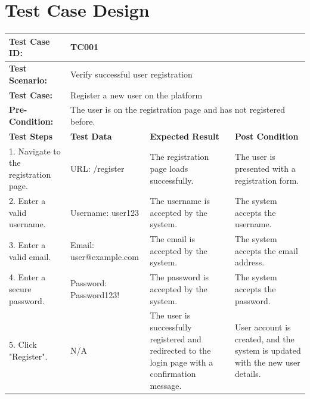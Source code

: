 \documentclass{scrreprt}
\begin{document}
\chapter{Test Case Design}

\begin{longtable}{| m{2cm} | m{5cm} | m{4cm} | m{3cm} |}
\hline
\textbf{Test Case ID:} & \multicolumn{3}{l|}{TC001} \\ \hline
\textbf{Test Scenario:} & \multicolumn{3}{l|}{Verify successful user registration} \\ \hline
\textbf{Test Case:} & \multicolumn{3}{l|}{Register a new user on the platform} \\ \hline
\textbf{Pre-Condition:} & \multicolumn{3}{l|}{The user is on the registration page and has not registered before.} \\ \hline
\textbf{Test Steps} & \textbf{Test Data} & \textbf{Expected Result} & \textbf{Post Condition} \\ \hline
1. Navigate to the registration page. & URL: /register & The registration page loads successfully. & The user is presented with a registration form. \\ \hline
2. Enter a valid username. & Username: user123 & The username is accepted by the system. & The system accepts the username. \\ \hline
3. Enter a valid email. & Email: user@example.com & The email is accepted by the system. & The system accepts the email address. \\ \hline
4. Enter a secure password. & Password: Password123! & The password is accepted by the system. & The system accepts the password. \\ \hline
5. Click "Register". & N/A & The user is successfully registered and redirected to the login page with a confirmation message. & User account is created, and the system is updated with the new user details. \\ \hline
\end{longtable}

\vspace{1cm}
\newpage
\end{document}
